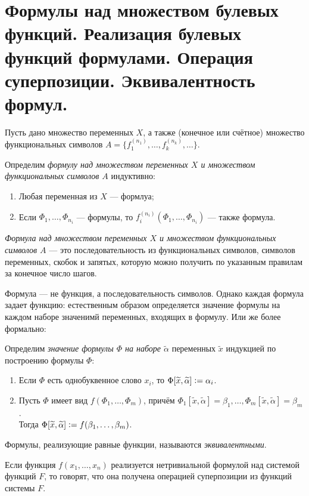 \section{Формулы над множеством булевых функций. Реализация булевых функций формулами. Операция суперпозиции. Эквивалентность формул.}
Пусть дано множество переменных $X$, а также (конечное или счётное) множество функциональных символов $A=\{f_1^{(n_1)}, \ldots, f_k^{(n_k)},\ldots\}$.
\begin{definition}
    Определим \textit{формулу над множеством переменных $X$ и множеством функциональных символов $A$} индуктивно:
    \begin{enumerate}[nolistsep]
        \item Любая переменная из $X$ --- формлуа;
        \item Если $\Phi_1,\ldots ,\Phi_{n_i}$ --- формулы, то $f_i^{(n_i)}(\Phi_1, \ldots, \Phi_{n_i})$ --- также формула.
    \end{enumerate}
\end{definition}
\textit{Формула над множеством переменных $X$ и множеством функциональных символов $A$} --- это
последовательность из функциональных символов, символов
переменных, скобок и запятых, которую можно получить по
указанным правилам за конечное число шагов.

Формула --- не функция, а последовательность символов.
Однако каждая формула задает функцию: естественным образом определяется значение формулы на каждом наборе значенимй переменных, входящих в формулу. Или же более формально:
\begin{definition}
    Определим \textit{значение формулы $\Phi$ на наборе $\widetilde{\alpha}$} переменных $\widetilde{x}$ индукцией по построению формулы $\Phi$:
    \begin{enumerate}[nolistsep]
        \item Если $\Phi$ есть однобуквенное слово $x_{i}$, то $\Phi[\widetilde{x}, \widetilde{\alpha}] \vcentcolon = \alpha_i$.
        \item Пусть $\Phi$ имеет вид $f(\Phi_1, \ldots, \Phi_m)$, причём $\Phi_1[\widetilde{x}, \widetilde{\alpha}] = \beta_1, \ldots, \Phi_m[\widetilde{x}, \widetilde{\alpha}] = \beta_m$. \\Тогда $\Phi[\widetilde{x}, \widetilde{\alpha}] \vcentcolon = f(\beta_1, \ldots, \beta_m)$.
    \end{enumerate}
\end{definition}

\begin{definition}
    Формулы, реализующие равные функции, называются \textit{эквивалентными}.
\end{definition}

\begin{definition}
    Если функция $f(x_1, \ldots, x_n)$ реализуется нетривиальной формулой над системой функций $F$, то говорят, что она получена операцией суперпозиции из функций системы $F$.
\end{definition}